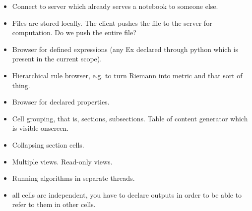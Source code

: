 
\begin{itemize}

\item Connect to server which already serves a notebook to someone
  else.

\item Files are stored locally. The client pushes the file to the
  server for computation. Do we push the entire file?

\item Browser for defined expressions (any Ex declared through python
  which is present in the current scope).

\item Hierarchical rule browser, e.g. to turn Riemann into metric and
  that sort of thing.

\item Browser for declared properties.

\item Cell grouping, that is, sections, subsections. Table of content
  generator which is visible onscreen. 

\item Collapsing section cells.

\item Multiple views. Read-only views.

\item Running algorithms in separate threads.

\item all cells are independent, you have to declare outputs in order to
be able to refer to them in other cells.

\end{itemize}

